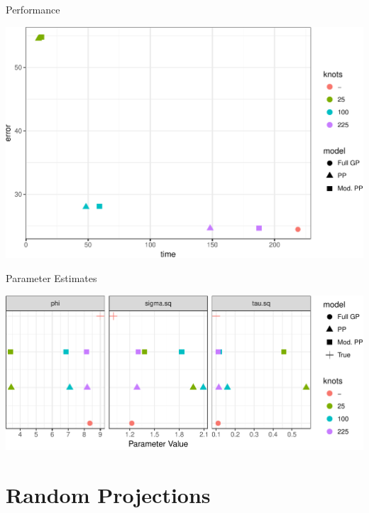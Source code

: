 \documentclass[11pt,ignorenonframetext,]{beamer}
\begin{document}
\begin{frame}{Performance}
\protect\hypertarget{performance}{}

\begin{center}\includegraphics[width=\textwidth]{Lec21_files/figure-beamer/unnamed-chunk-16-1} \end{center}

\end{frame}

\begin{frame}{Parameter Estimates}
\protect\hypertarget{parameter-estimates}{}

\begin{center}\includegraphics[width=\textwidth]{Lec21_files/figure-beamer/unnamed-chunk-17-1} \end{center}

\end{frame}

\hypertarget{random-projections}{%
\section{Random Projections}\label{random-projections}}
\end{document}
